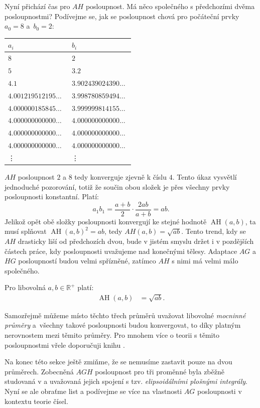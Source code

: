 \documentclass[12pt]{report}
\DeclareMathOperator{\AH}{AH}
\begin{document}
Nyní přichází čas pro $AH$ posloupnost. Má něco společného s předchozími dvěma posloupnostmi? Podívejme se, jak se posloupnost chová pro počáteční prvky $a_0 = 8$ a~$b_0 = 2$:

\begin{longtable}[H]{>{\raggedright\arraybackslash}p{0.3\linewidth}p{0.202\linewidth}}
\toprule
$a_i$ & $b_i$\\
\midrule
$8$ & \noindent $2$\\
$5$ & \noindent $3.2$\\
$4.1$ & $3.902439024390\dots$\\
$4.001219512195\dots$ & $3.998780859494\dots$\\ 
$4.000000185845\dots$ & $3.999999814155\dots$\\
$4.000000000000\dots$ & $4.000000000000\dots$\\
$4.000000000000\dots$ & $4.000000000000\dots$\\
$4.000000000000\dots$ & $4.000000000000\dots$\\
\vdots & \vdots\\
\bottomrule 
\end{longtable} 

$AH$ posloupnost $2$ a $8$ tedy konverguje zjevně k číslu $4$. Tento úkaz vysvětlí jednoduché pozorování, totiž že součin obou složek je přes všechny prvky posloupnosti konstantní. Platí:
$$a_1  b_1 = \frac{a+b}{2} \cdot \frac{2ab}{a+b} = ab.$$
Jelikož opět obě složky posloupnosti konvergují ke stejné hodnotě $\AH(a,b)$, ta musí splňovat $\AH (a,b)^2 = ab$, tedy $AH(a,b) = \sqrt{ab}$. Tento trend, kdy se $AH$ drasticky liší od předchozích dvou, bude v jistém smyslu držet i v pozdějších částech práce, kdy posloupnosti uvažujeme nad konečnými tělesy. Adaptace $AG$ a $HG$ posloupností budou velmi spřízněné, zatímco $AH$ s nimi má velmi málo společného.

\begin{veta}
Pro libovolná $a,b \in \mathbb{R}^{+}$ platí:
\begin{align*}
\AH(a,b) &= \sqrt{ab}.
\end{align*}
\end{veta}

Samozřejmě můžeme místo těchto třech průměrů uvažovat libovolné \textit{mocninné průměry} a~všechny takové posloupnosti budou konvergovat, to díky platným nerovnostem mezi těmito průměry. Pro mnohem více o teorii s těmito posloupnostmi vřele doporučuji knihu \cite{Pi}.

Na konec této sekce ještě zmiňme, že se nemusíme zastavit pouze na dvou průměrech. Zobecněná $AGH$ posloupnost pro tři proměnné byla zběžně studovaná v \cite{Dalpatadu} a uvažovaná jejich spojení s tzv. \textit{elipsoidálními plošnými integrály}. Nyní se ale obraťme list a podívejme se více na vlastnosti $AG$ posloupnosti v kontextu teorie čísel. 
\end{document}
